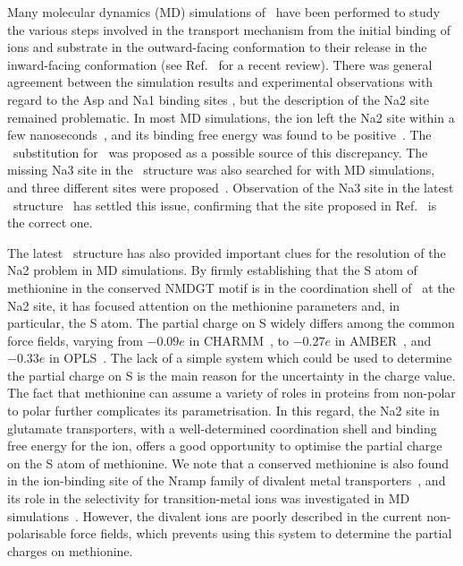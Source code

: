 Many molecular dynamics (MD) simulations of \GltPh\ have been performed to study the various 
steps involved in the transport mechanism from the initial binding of ions and substrate in the 
outward-facing conformation to their release in the inward-facing conformation (see 
Ref.~\cite{Setiadi2015} for a recent review). There was general agreement between the simulation 
results and experimental observations with regard to the Asp and Na1 binding sites 
\cite{Shrivastava2008,Huang2008,Grazioso2012,DeChancie2011a,Heinzelmann2011,Heinzelmann2013,Heinzelmann2014a}, 
but the description of the Na2 site remained problematic. In most MD simulations, the \Na{} ion 
left the Na2 site within a few nanoseconds~\cite{DeChancie2011a,Heinzelmann2011,Heinzelmann2013,
Heinzelmann2014a,Venkatesan2015}, and its binding free energy was found to be 
positive~\cite{Heinzelmann2013,Heinzelmann2011}. The \Tl\ substitution for \Na\ was proposed as a 
possible source of this discrepancy. The missing Na3 site in the \GltPh\ structure was also searched 
for with MD simulations, and three different sites were proposed~\cite{Larsson2010,Huang2010,
Bastug2012}. Observation of the Na3 site in the latest \GltTk\ structure~\cite{Guskov2016} has 
settled this issue, confirming that the site proposed in Ref.~\cite{Bastug2012} is the correct one. 

The latest \GltTk\ structure has also provided important clues for the resolution of the Na2 problem 
in MD simulations. By firmly establishing that the S atom of methionine in the conserved NMDGT motif 
is in the coordination shell of \Na\ at the Na2 site, it has focused attention on the methionine 
parameters and, in particular, the S atom. The partial charge on S widely differs among the common 
force fields, varying from $-0.09e$ in CHARMM~\cite{MacKerell1998}, to $-0.27e$ in 
AMBER~\cite{Hornak2006}, and $-0.33e$ in OPLS~\cite{Jorgensen1996}. The lack of a simple system 
which could be used to determine the partial charge on S is the main reason for the uncertainty 
in the charge value. The fact that methionine can assume a variety of roles in proteins from 
non-polar to polar further complicates its parametrisation. In this regard, the Na2 site in 
glutamate transporters, with a well-determined coordination shell and binding free energy for the 
\Na{} ion, offers a good opportunity to optimise the partial charge on the S atom of methionine. 
We note that a conserved methionine is also found in the ion-binding site of the Nramp family of 
divalent metal transporters~\cite{Ehrnstorfer2014}, and its role in the selectivity for 
transition-metal ions was investigated in MD simulations~\cite{Bozzi2016}. However, the divalent 
ions are poorly described in the current non-polarisable force fields, which prevents using this 
system to determine the partial charges on methionine.

